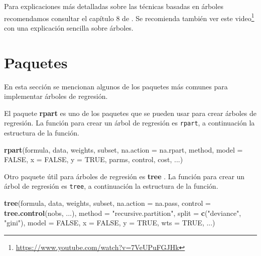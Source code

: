 \documentclass[]{book}
\makeatletter
\newenvironment{Shaded}{\begin{snugshade}}{\end{snugshade}}
\newcommand{\DataTypeTok}[1]{\textcolor[rgb]{0.13,0.29,0.53}{#1}}
\newcommand{\KeywordTok}[1]{\textcolor[rgb]{0.13,0.29,0.53}{\textbf{#1}}}
\newcommand{\NormalTok}[1]{#1}
\newcommand{\OtherTok}[1]{\textcolor[rgb]{0.56,0.35,0.01}{#1}}
\newcommand{\StringTok}[1]{\textcolor[rgb]{0.31,0.60,0.02}{#1}}
\let\rmarkdownfootnote\footnote%
\def\footnote{\protect\rmarkdownfootnote}
\renewcommand{\href}[2]{#2\footnote{\url{#1}}}
\newenvironment{kframe}{%
\medskip{}
\setlength{\fboxsep}{.8em}
 \def\at@end@of@kframe{}%
 \ifinner\ifhmode%
  \def\at@end@of@kframe{\end{minipage}}%
  \begin{minipage}{\columnwidth}%
 \fi\fi%
 \def\FrameCommand##1{\hskip\@totalleftmargin \hskip-\fboxsep
 \colorbox{shadecolor}{##1}\hskip-\fboxsep
     \hskip-\linewidth \hskip-\@totalleftmargin \hskip\columnwidth}%
 \MakeFramed {\advance\hsize-\width
   \@totalleftmargin\z@ \linewidth\hsize
   \@setminipage}}%
 {\par\unskip\endMakeFramed%
 \at@end@of@kframe}
\renewenvironment{Shaded}{\begin{kframe}}{\end{kframe}}
\makeatother
\begin{document}
Para explicaciones más detalladas sobre las técnicas basadas en árboles recomendamos consultar el capítulo 8 de \citep{james2013}. Se recomienda también ver \href{https://www.youtube.com/watch?v=7VeUPuFGJHk}{este video} con una explicación sencilla sobre árboles.

\hypertarget{paquetes}{%
\section*{Paquetes}\label{paquetes}}

En esta sección se mencionan algunos de los paquetes más comunes para implementar árboles de regresión.

El paquete \textbf{rpart} \citep{R-rpart} es uno de los paquetes que se pueden usar para crear árboles de regresión. La función para crear un árbol de regresión es \texttt{rpart}, a continuación la estructura de la función.

\begin{Shaded}
\begin{Highlighting}[]
\KeywordTok{rpart}\NormalTok{(formula, data, weights, subset, }\DataTypeTok{na.action =}\NormalTok{ na.rpart, method,}
      \DataTypeTok{model =} \OtherTok{FALSE}\NormalTok{, }\DataTypeTok{x =} \OtherTok{FALSE}\NormalTok{, }\DataTypeTok{y =} \OtherTok{TRUE}\NormalTok{, parms, control, cost, ...)}
\end{Highlighting}
\end{Shaded}

Otro paquete útil para árboles de regresión es \textbf{tree} \citep{R-tree}. La función para crear un árbol de regresión es \texttt{tree}, a continuación la estructura de la función.

\begin{Shaded}
\begin{Highlighting}[]
\KeywordTok{tree}\NormalTok{(formula, data, weights, subset,}
     \DataTypeTok{na.action =}\NormalTok{ na.pass, }\DataTypeTok{control =} \KeywordTok{tree.control}\NormalTok{(nobs, ...),}
     \DataTypeTok{method =} \StringTok{"recursive.partition"}\NormalTok{,}
     \DataTypeTok{split =} \KeywordTok{c}\NormalTok{(}\StringTok{"deviance"}\NormalTok{, }\StringTok{"gini"}\NormalTok{),}
     \DataTypeTok{model =} \OtherTok{FALSE}\NormalTok{, }\DataTypeTok{x =} \OtherTok{FALSE}\NormalTok{, }\DataTypeTok{y =} \OtherTok{TRUE}\NormalTok{, }\DataTypeTok{wts =} \OtherTok{TRUE}\NormalTok{, ...)}
\end{Highlighting}
\end{Shaded}
\end{document}
